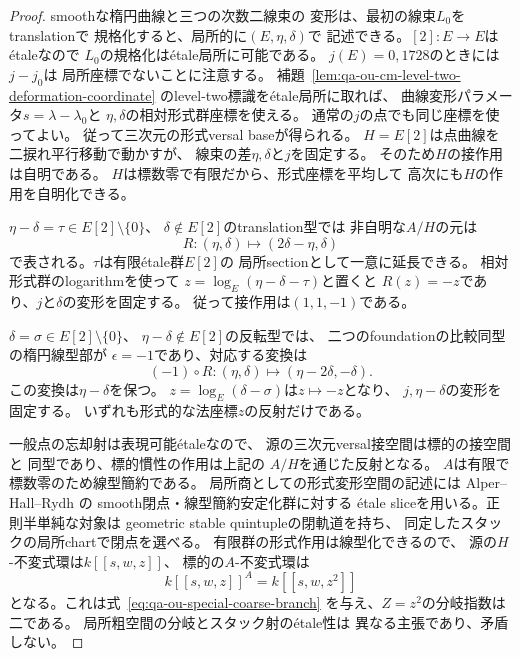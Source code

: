 \begin{proof}
smoothな楕円曲線と三つの次数二線束の
変形は、最初の線束$L_0$をtranslationで
規格化すると、局所的に$(E,\eta,\delta)$で
記述できる。$[2]:E\to E$はétaleなので
$L_0$の規格化はétale局所に可能である。
$j(E)=0,1728$のときには$j-j_0$は
局所座標でないことに注意する。
補題~\ref{lem:qa-ou-cm-level-two-deformation-coordinate}
のlevel-two標識をétale局所に取れば、
曲線変形パラメータ$s=\lambda-\lambda_0$と
$\eta,\delta$の相対形式群座標を使える。
通常の$j$の点でも同じ座標を使ってよい。
従って三次元の形式versal baseが得られる。
$H=E[2]$は点曲線を二捩れ平行移動で動かすが、
線束の差$\eta,\delta$と$j$を固定する。
そのため$H$の接作用は自明である。
$H$は標数零で有限だから、形式座標を平均して
高次にも$H$の作用を自明化できる。

$\eta-\delta=\tau\in E[2]\setminus\{0\}$、
$\delta\notin E[2]$のtranslation型では
非自明な$A/H$の元は
\[
 R:(\eta,\delta)\longmapsto(2\delta-\eta,\delta)
\]
で表される。$\tau$は有限étale群$E[2]$の
局所sectionとして一意に延長できる。
相対形式群のlogarithmを使って
$z=\log_E(\eta-\delta-\tau)$と置くと
$R(z)=-z$であり、$j$と$\delta$の変形を固定する。
従って接作用は$(1,1,-1)$である。

$\delta=\sigma\in E[2]\setminus\{0\}$、
$\eta-\delta\notin E[2]$の反転型では、
二つのfoundationの比較同型の楕円線型部が
$\epsilon=-1$であり、対応する変換は
\[
 (-1)\circ R:(\eta,\delta)
        \longmapsto(\eta-2\delta,-\delta).
\]
この変換は$\eta-\delta$を保つ。
$z=\log_E(\delta-\sigma)$は$z\mapsto-z$となり、
$j,\eta-\delta$の変形を固定する。
いずれも形式的な法座標$z$の反射だけである。

一般点の忘却射は表現可能étaleなので、
源の三次元versal接空間は標的の接空間と
同型であり、標的慣性の作用は上記の
$A/H$を通じた反射となる。
$A$は有限で標数零のため線型簡約である。
局所商としての形式変形空間の記述には
Alper--Hall--Rydh
\cite[Theorem 1.2]{AlperHallRydh2020}の
smooth閉点・線型簡約安定化群に対する
étale sliceを用いる。正則半単純な対象は
geometric stable quintupleの閉軌道を持ち、
同定したスタックの局所chartで閉点を選べる。
有限群の形式作用は線型化できるので、
源の$H$-不変式環は$k[[s,w,z]]$、
標的の$A$-不変式環は
\[
 k[[s,w,z]]^A=k[[s,w,z^2]]
\]
となる。これは式~\eqref{eq:qa-ou-special-coarse-branch}
を与え、$Z=z^2$の分岐指数は二である。
局所粗空間の分岐とスタック射のétale性は
異なる主張であり、矛盾しない。
\end{proof}

